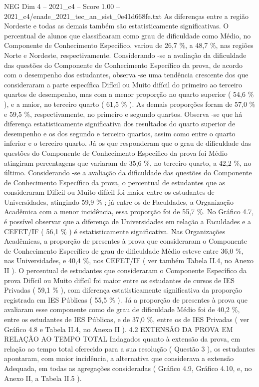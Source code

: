 \begin{textsample}{NEG Dim 4 – 2021\_c4 – Score 1.00 – 2021\_c4/enade\_2021\_tec\_an\_sist\_0e41d668fe.txt}
As diferenças entre a região Nordeste e todas as demais também são estatisticamente significativas.
O percentual de alunos que classificaram como grau de dificuldade como Médio, no Componente de Conhecimento Específico, variou de 26,7 \%, a 48,7 \%, nas regiões Norte e Nordeste, respectivamente.
Considerando -se a avaliação da dificuldade das questões do Componente de Conhecimento Específico da prova, de acordo com o desempenho dos estudantes, observa -se uma tendência crescente dos que consideraram a parte específica Difícil ou Muito difícil do primeiro ao terceiro quartos de desempenho, mas com a menor proporção no quarto superior ( 54,6 \% ), e a maior, no terceiro quarto ( 61,5 \% ).
As demais proporções foram de 57,0 \% e 59,5 \%, respectivamente, no primeiro e segundo quartos.
Observa -se que há diferença estatisticamente significativa dos resultados do quarto superior de desempenho e os dos segundo e terceiro quartos, assim como entre o quarto inferior e o terceiro quarto.
Já os que responderam que o grau de dificuldade das questões do Componente de Conhecimento Específico da prova foi Médio atingiram percentagens que variaram de 35,6 \%, no terceiro quarto, a 42,2 \%, no último.
Considerando -se a avaliação da dificuldade das questões do Componente de Conhecimento Específico da prova, o percentual de estudantes que as consideraram Difícil ou Muito difícil foi maior entre os estudantes de Universidades, atingindo 59,9 \% ; já entre os de Faculdades, a Organização Acadêmica com a menor incidência, essa proporção foi de 55,7 \%.
No Gráfico 4.7, é possível observar que a diferença de Universidades em relação a Faculdades e a CEFET/IF ( 56,1 \% ) é estatisticamente significativa.
Nas Organizações Acadêmicas, a proporção de presentes à prova que consideraram o Componente de Conhecimento Específico de grau de dificuldade Médio esteve entre 36,0 \%, nas Universidades, e 40,4 \%, nos CEFET/IF ( ver também Tabela II.4, no Anexo II ).
O percentual de estudantes que consideraram o Componente Específico da prova Difícil ou Muito difícil foi maior entre os estudantes de cursos de IES Privadas ( 59,1 \% ), com diferença estatisticamente significativa da proporção registrada em IES Públicas ( 55,5 \% ).
Já a proporção de presentes à prova que avaliaram esse componente como de grau de dificuldade Médio foi de 40,2 \%, entre os estudantes de IES Públicas, e de 37,0 \%, entre os de IES Privadas ( ver Gráfico 4.8 e Tabela II.4, no Anexo II ). 4.2 EXTENSÃO DA PROVA EM RELAÇÃO AO TEMPO TOTAL Indagados quanto à extensão da prova, em relação ao tempo total oferecido para a sua resolução ( Questão 3 ), os estudantes apontaram, com maior incidência, a alternativa que considerava a extensão Adequada, em todas as agregações consideradas ( Gráfico 4.9, Gráfico 4.10, e, no Anexo II, a Tabela II.5 ).

\end{textsample}

